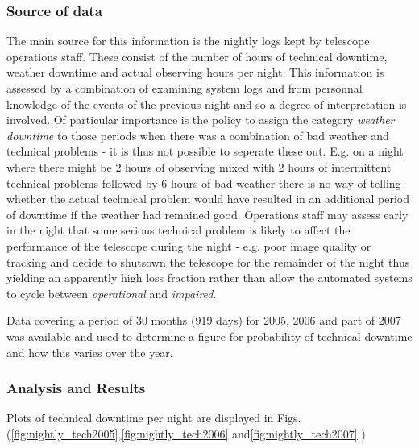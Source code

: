\subsubsection{Source of data}
The main source for this information is the nightly logs kept by telescope operations staff. These consist of the number of hours of technical downtime, weather downtime and actual observing hours per night. This information is assessed by a combination of examining system logs and from personnal knowledge of the events of the previous night and so a degree of interpretation is involved. Of particular importance is the policy to assign the category \emph{weather downtime} to those periods when there was a combination of bad weather and technical problems - it is thus not possible to seperate these out. E.g. on a night where there might be 2 hours of observing mixed with 2 hours of intermittent technical problems followed by 6 hours of bad weather there is no way of telling whether the actual technical problem would have resulted in an additional period of downtime if the weather had remained good. Operations staff may assess early in the night that some serious technical problem is likely to affect the performance of the telescope during the night - e.g. poor image quality or tracking and decide to shutsown the telescope for the remainder of the night thus yielding an apparently high loss fraction rather than allow the automated systems to cycle between \emph{operational} and \emph{impaired}.

Data covering a period of 30 months (919 days) for 2005, 2006 and part of 2007 was available and used to determine a figure for probability of technical downtime and how this varies over the year. 

\subsubsection{Analysis and Results}

Plots of technical downtime per night are displayed in Figs. (\ref{fig:nightly_tech2005},\ref{fig:nightly_tech2006} and\ref{fig:nightly_tech2007} ) 

